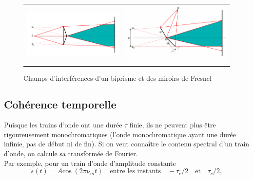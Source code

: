 \documentclass[11pt,a4paper]{report}
\begin{document}
\begin{figure}[h!]
	\begin{center}
		\begin{tabular}{cc}
  		\includegraphics[scale = 0.6]{biprisme.png} &
   		\includegraphics[scale = 0.6]{fresnel_mirrors.png}\\
	\end{tabular}
	\end{center}
	\caption{Champs d'interférences d'un biprisme et des miroirs de Fresnel}
\end{figure}

\newpage
\subsection{Cohérence temporelle}

Puisque les trains d'onde ont une durée $\tau$ finie, ils ne peuvent plus être rigoureusement monochromatiques (l'onde monochromatique ayant une durée infinie, pas de début ni de fin). Si on veut connaître le contenu spectral d'un train d'onde, on calcule sa transformée de Fourier.\\ 

Par exemple, pour un train d'onde d'amplitude constante
\begin{equation}
	s(t) = A\text{cos}\;\left(2\pi\nu_m t\right) \quad\text{entre les instants}\quad -\tau_c/2
	\quad\text{et}\quad\tau_c/2,
\end{equation}
\end{document}
